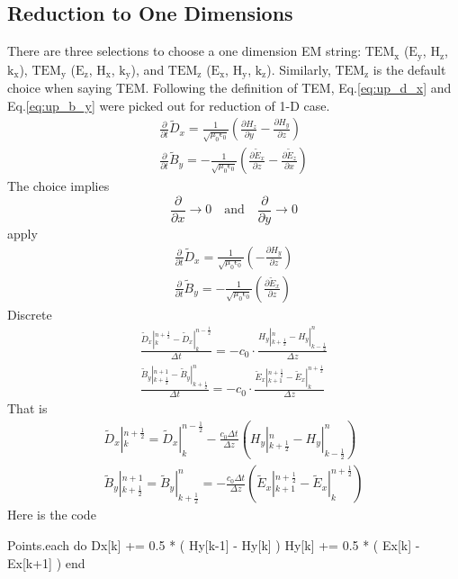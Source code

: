 \subsection{Reduction to One Dimensions}
There are three selections to choose a one dimension EM string: $\mathrm{TEM_x}$ ($\mathrm{E_{y}}$, $\mathrm{H_{z}}$,
$\mathrm{k_x}$), $\mathrm{TEM_y}$ ($\mathrm{E_z}$, $\mathrm{H_x}$, $\mathrm{k_y}$), and $\mathrm{TEM_z}$
($\mathrm{E_x}$, $\mathrm{H_y}$, $\mathrm{k_z}$). Similarly, $\mathrm{TEM_z}$ is the default choice when saying
TEM. Following the definition of TEM, Eq.\ref{eq:up_d_x} and Eq.\ref{eq:up_b_y} were picked out for reduction of 1-D
case.
\begin{gather*}
  \frac{\partial}{\partial t}\widetilde{D}_x = \frac{1}{\sqrt{\mu_0\epsilon_0}}\left(\frac{\partial H_z}{\partial y} - \frac{\partial H_y}{\partial z}\right)\\
  \frac{\partial}{\partial t}\widetilde{B}_y =-\frac{1}{\sqrt{\mu_0\epsilon_0}}\left(\frac{\partial \widetilde{E}_x}{\partial z} - \frac{\partial \widetilde{E}_z}{\partial x}\right)
\end{gather*}
The choice implies
\begin{displaymath}
  \frac{\partial}{\partial x} \rightarrow 0\quad \mathrm{and} \quad
  \frac{\partial}{\partial y} \rightarrow 0
\end{displaymath}
apply
\begin{gather}
  \frac{\partial}{\partial t}\widetilde{D}_x = \frac{1}{\sqrt{\mu_0\epsilon_0}}\left( - \frac{\partial H_y}{\partial z}\right)\\
  \frac{\partial}{\partial t}\widetilde{B}_y =-\frac{1}{\sqrt{\mu_0\epsilon_0}}\left(\frac{\partial \widetilde{E}_x}{\partial z} \right)
\end{gather}
Discrete
\begin{gather}
  \frac{\widetilde{D}_x|_k^{n+\frac{1}{2}} - \widetilde{D}_x|_k^{n-\frac{1}{2}}}{\Delta t} = -c_0\cdot\frac{H_y|_{k+\frac{1}{2}}^n - H_y|_{k-\frac{1}{2}}^n}{\Delta z}\\
  \frac{\widetilde{B}_y|_{k+\frac{1}{2}}^{n+1} - \widetilde{B}_y|_{k+\frac{1}{2}}^n}{\Delta t} = -c_0\cdot\frac{\widetilde{E}_x|_{k+1}^{n+\frac{1}{2}} - \widetilde{E}_x|_{k}^{n+\frac{1}{2}}}{\Delta z}
\end{gather}
That is
\begin{gather}
  \widetilde{D}_x|_k^{n+\frac{1}{2}} = \widetilde{D}_x|_k^{n-\frac{1}{2}} - \frac{c_0\Delta t}{\Delta z}\left( H_y|_{k+\frac{1}{2}}^n - H_y|_{k-\frac{1}{2}}^n \right)\\
  \widetilde{B}_y|_{k+\frac{1}{2}}^{n+1} = \widetilde{B}_y|_{k+\frac{1}{2}}^{n} = - \frac{c_0\Delta t}{\Delta z}\left( \widetilde{E}_x|_{k+1}^{n+\frac{1}{2}} - \widetilde{E}_x|_{k}^{n+\frac{1}{2}} \right)
\end{gather}
Here is the code
\begin{code}
Points.each do
  Dx[k] += 0.5 * ( Hy[k-1] - Hy[k] )
  Hy[k] += 0.5 * ( Ex[k] - Ex[k+1] )
end
\end{code}




